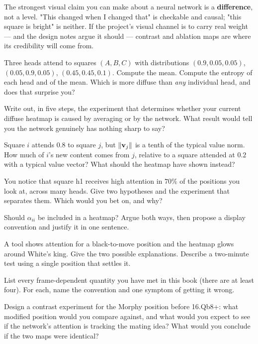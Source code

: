 \begin{keyidea}
The strongest visual claim you can make about a neural network is a \textbf{difference}, not a
level. "This changed when I changed that" is checkable and causal; "this square is bright" is
neither. If the project's visual channel is to carry real weight --- and the design notes argue
it should --- contrast and ablation maps are where its credibility will come from.
\end{keyidea}

\begin{exercises}

 Three heads attend to squares $(A,B,C)$ with distributions
$(0.9,0.05,0.05)$, $(0.05,0.9,0.05)$, $(0.45,0.45,0.1)$. Compute the mean. Compute the
entropy of each head and of the mean. Which is more diffuse than \emph{any} individual head,
and does that surprise you?

 Write out, in five steps, the experiment that
determines whether your current diffuse heatmap is caused by averaging or by the network. What
result would tell you the network genuinely has nothing sharp to say?

 Square $i$ attends $0.8$ to square $j$, but
$\lVert\mathbf{v}_j\rVert$ is a tenth of the typical value norm. How much of $i$'s new content
comes from $j$, relative to a square attended at $0.2$ with a typical value vector? What
should the heatmap have shown instead?

 You notice that square h1 receives high attention in $70\%$ of the
positions you look at, across many heads. Give two hypotheses and the experiment that
separates them. Which would you bet on, and why?

 Should $\alpha_{ii}$ be included in a heatmap? Argue both
ways, then propose a display convention and justify it in one sentence.

 A tool shows attention for a black-to-move position and the
heatmap glows around White's king. Give the two possible explanations. Describe a two-minute
test using a single position that settles it.

 List every frame-dependent quantity you have met in this book
(there are at least four). For each, name the convention and one symptom of getting it wrong.

 Design a contrast experiment for the Morphy position
before 16.Qb8+: what modified position would you compare against, and what would you expect to
see if the network's attention is tracking the mating idea? What would you conclude if the two
maps were identical?


\end{exercises}
